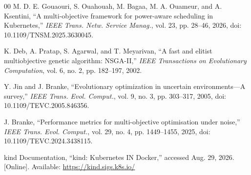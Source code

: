 \documentclass[conference]{IEEEtran}
\begin{document}
\begin{thebibliography}{00}
M. D. E. Gouaouri, S. Ouahouah, M. Bagaa, M. A. Ouameur, and A. Ksentini,
``A multi-objective framework for power-aware scheduling in Kubernetes,''
\emph{IEEE Trans. Netw. Service Manag.}, vol. 23, pp. 28--46, 2026,
doi: 10.1109/TNSM.2025.3630045.

K. Deb, A. Pratap, S. Agarwal, and T. Meyarivan,
``A fast and elitist multiobjective genetic algorithm: NSGA-II,''
\emph{IEEE Transactions on Evolutionary Computation},
vol. 6, no. 2, pp. 182--197, 2002.

Y. Jin and J. Branke,
``Evolutionary optimization in uncertain environments---A survey,''
\emph{IEEE Trans. Evol. Comput.}, vol. 9, no. 3, pp. 303--317, 2005,
doi: 10.1109/TEVC.2005.846356.

J. Branke,
``Performance metrics for multi-objective optimisation under noise,''
\emph{IEEE Trans. Evol. Comput.}, vol. 29, no. 4, pp. 1449--1455, 2025,
doi: 10.1109/TEVC.2024.3438115.

kind Documentation,
``kind: Kubernetes IN Docker,''
accessed Aug. 29, 2026.
[Online]. Available: \url{https://kind.sigs.k8s.io/}
\end{thebibliography}
\end{document}

